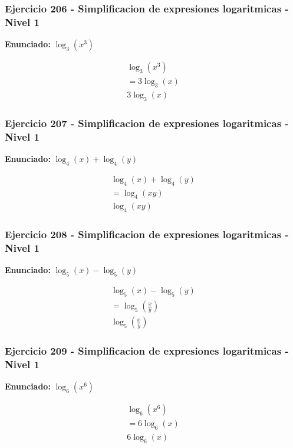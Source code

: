 \documentclass[12pt,a4paper]{article}
\begin{document}
\subsubsection*{Ejercicio 206 - Simplificacion de expresiones logaritmicas - Nivel 1}
\textbf{Enunciado:} \(\log_{3}\left(x^{3}\right)\)

\[
\begin{aligned}
\log_{3}\left(x^{3}\right)\\
=3\log_{3}\left(x\right)\\
\boxed{3\log_{3}\left(x\right)}
\end{aligned}
\]


\subsubsection*{Ejercicio 207 - Simplificacion de expresiones logaritmicas - Nivel 1}
\textbf{Enunciado:} \(\log_{4}\left(x\right)+\log_{4}\left(y\right)\)

\[
\begin{aligned}
\log_{4}\left(x\right)+\log_{4}\left(y\right)\\
=\log_{4}\left(xy\right)\\
\boxed{\log_{4}\left(xy\right)}
\end{aligned}
\]


\subsubsection*{Ejercicio 208 - Simplificacion de expresiones logaritmicas - Nivel 1}
\textbf{Enunciado:} \(\log_{5}\left(x\right)-\log_{5}\left(y\right)\)

\[
\begin{aligned}
\log_{5}\left(x\right)-\log_{5}\left(y\right)\\
=\log_{5}\left(\frac{x}{y}\right)\\
\boxed{\log_{5}\left(\frac{x}{y}\right)}
\end{aligned}
\]


\subsubsection*{Ejercicio 209 - Simplificacion de expresiones logaritmicas - Nivel 1}
\textbf{Enunciado:} \(\log_{6}\left(x^{6}\right)\)

\[
\begin{aligned}
\log_{6}\left(x^{6}\right)\\
=6\log_{6}\left(x\right)\\
\boxed{6\log_{6}\left(x\right)}
\end{aligned}
\]
\end{document}
